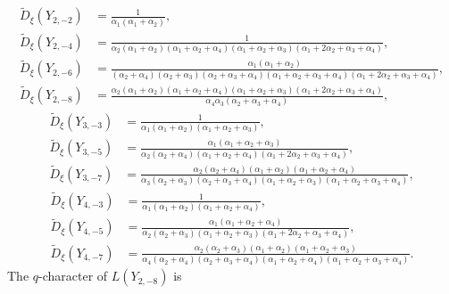 \documentclass[12pt]{amsart}
\theoremstyle{plain}
\theoremstyle{definition}
\numberwithin{equation}{section}
\newcommand{\td}{{\widetilde{D}}}
\begin{document}
\begin{align*}
\td_{\xi}(Y_{2,-2}) &=
\frac{1}{\alpha_1 (\alpha_1 + \alpha_2)}, \\
%
\td_{\xi}(Y_{2,-4}) &=
\frac{1}{
\alpha_2 (\alpha_1 + \alpha_2) (\alpha_1 + \alpha_2 + \alpha_4)
(\alpha_1 + \alpha_2 + \alpha_3) (\alpha_1 + 2\alpha_2 + \alpha_3 + \alpha_4)
}, \\
%
\td_{\xi}(Y_{2,-6}) &=
\frac{
\alpha_1 (\alpha_1 + \alpha_2)
}{
(\alpha_2 + \alpha_4) (\alpha_2 + \alpha_3) (\alpha_2 + \alpha_3 + \alpha_4)
(\alpha_1 + \alpha_2 + \alpha_3 + \alpha_4)
(\alpha_1 + 2\alpha_2 + \alpha_3 + \alpha_4)
}, \\
%
\td_{\xi}(Y_{2,-8}) &=
\frac{
\alpha_2 (\alpha_1 + \alpha_2) (\alpha_1 + \alpha_2 + \alpha_4)
(\alpha_1 + \alpha_2 + \alpha_3) (\alpha_1 + 2\alpha_2 + \alpha_3 + \alpha_4)
}{
\alpha_4 \alpha_3 (\alpha_2 + \alpha_3 + \alpha_4)
}, 
\end{align*}
\begin{align*}
\td_{\xi}(Y_{3,-3}) &=
\frac{1}{
\alpha_1 (\alpha_1 + \alpha_2) (\alpha_1 + \alpha_2 + \alpha_3)
}, \\
%
\td_{\xi}(Y_{3,-5}) &=
\frac{
\alpha_1 (\alpha_1 + \alpha_2 + \alpha_3)
}{
\alpha_2 (\alpha_2 + \alpha_4) (\alpha_1 + \alpha_2 + \alpha_4)
(\alpha_1 + 2\alpha_2 + \alpha_3 + \alpha_4)
}, \\
%
\td_{\xi}(Y_{3,-7}) &=
\frac{
\alpha_2 (\alpha_2 + \alpha_4) (\alpha_1 + \alpha_2)
(\alpha_1 + \alpha_2 + \alpha_4)
}{
\alpha_3 (\alpha_2 + \alpha_3) (\alpha_2 + \alpha_3 + \alpha_4)
(\alpha_1 + \alpha_2 + \alpha_3)
(\alpha_1 + \alpha_2 + \alpha_3 + \alpha_4)
}, 
\end{align*}
\begin{align*}
\td_{\xi}(Y_{4,-3}) &=
\frac{1}{
\alpha_1 (\alpha_1 + \alpha_2) (\alpha_1 + \alpha_2 + \alpha_4)
}, \\
%
\td_{\xi}(Y_{4,-5}) &=
\frac{
\alpha_1 (\alpha_1 + \alpha_2 + \alpha_4)
}{
\alpha_2 (\alpha_2 + \alpha_3) (\alpha_1 + \alpha_2 + \alpha_3)
(\alpha_1 + 2\alpha_2 + \alpha_3 + \alpha_4)
}, \\
%
\td_{\xi}(Y_{4,-7}) &=
\frac{
\alpha_2 (\alpha_2 + \alpha_3) (\alpha_1 + \alpha_2)
(\alpha_1 + \alpha_2 + \alpha_3)
}{
\alpha_4 (\alpha_2 + \alpha_4) (\alpha_2 + \alpha_3 + \alpha_4)
(\alpha_1 + \alpha_2 + \alpha_4)
(\alpha_1 + \alpha_2 + \alpha_3 + \alpha_4)
}.
\end{align*}
The $q$-character of $L(Y_{2,-8})$ is 
\end{document}
